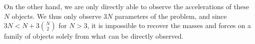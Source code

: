 
%
%


%
%
%
%


On the other hand, we are only directly able to observe the accelerations of these $N$ objects. We thus only observe $3N$ parameters of the problem, and since $3N < N + 3 {N \choose 2}$ for $N > 3$, it is impossible to recover the masses and forces on a family of objects solely from what can be directly observed.



